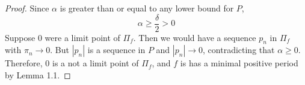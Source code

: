 \documentclass[12pt, reqno]{amsart}
\theoremstyle{definition}
\theoremstyle{remark}
\begin{document}
\begin{itemize}
\begin{proof}
Since $\alpha$ is greater than or equal to any lower bound for $P$, $$\alpha\ge \frac{\delta}{2}>0$$Suppose 0 were a limit point of $\Pi_f$. Then we would have a sequence $p_{n}$ in $\Pi_f$ with $\pi_{n}\rightarrow 0$. But $|p_{n}|$ is a sequence in $P$ and $|p_{n}|\rightarrow 0$, contradicting that $\alpha\ge0$. Therefore, $0$ is a not a limit point of $\Pi_f$, and $f$ is has a minimal positive period by Lemma 1.1.





\end{proof}



\end{itemize}
\end{document}
